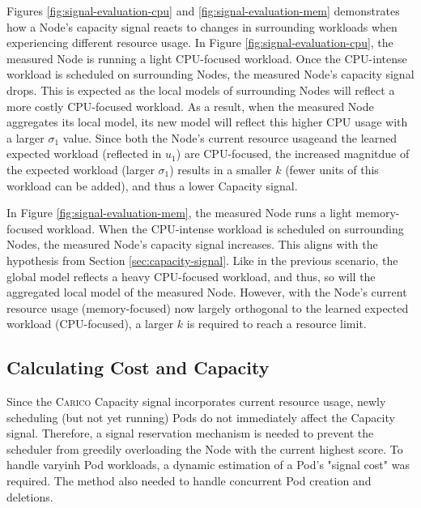 Figures \ref{fig:signal-evaluation-cpu} and \ref{fig:signal-evaluation-mem}
demonstrates how a Node's capacity signal reacts to changes in surrounding
workloads when experiencing different resource usage. In Figure
\ref{fig:signal-evaluation-cpu}, the measured Node is running a light CPU-focused
workload. Once the CPU-intense workload is scheduled on surrounding Nodes, the
measured Node's capacity signal drops. This is expected as the local models of
surrounding Nodes will reflect a more costly CPU-focused workload. As a result,
when the measured Node aggregates its local model, its new model will reflect
this higher CPU usage with a larger $\sigma_1$ value. Since both the Node's
current resource usageand the learned expected workload (reflected in $u_1$) are
CPU-focused, the increased magnitdue of the expected workload (larger
$\sigma_1$) results in a smaller $k$ (fewer units of this workload can be
added), and thus a lower Capacity signal.

In Figure \ref{fig:signal-evaluation-mem}, the measured Node runs a light
memory-focused workload. When the CPU-intense workload is scheduled on surrounding
Nodes, the measured Node's capacity signal increases. This aligns with the
hypothesis from Section \ref{sec:capacity-signal}. Like in the previous scenario, the global model
reflects a heavy CPU-focused workload, and thus, so will the aggregated local
model of the measured Node. However, with the Node's current resource usage
(memory-focused) now largely orthogonal to the learned expected workload
(CPU-focused), a larger $k$ is required to reach a resource limit.

\subsection{Calculating Cost and Capacity}
Since the \textsc{Carico} Capacity signal incorporates current resource usage,
newly scheduling (but not yet running) Pods do not immediately affect the
Capacity signal. Therefore, a signal reservation mechanism is needed to prevent
the scheduler from greedily overloading the Node with the current highest score.
To handle varyinh Pod workloads, a dynamic estimation of a Pod's "signal cost"
was required. The method also needed to handle concurrent Pod creation and
deletions.

